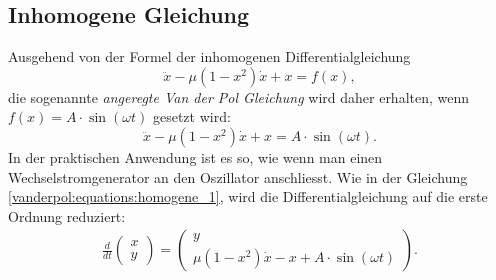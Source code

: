 \subsection{Inhomogene Gleichung}
\label{vanderpol:subsection:inhomogene}
Ausgehend von der Formel der inhomogenen Differentialgleichung
\begin{equation*}
	\ddot{x}-\mu(1-x^{2}) \dot{x}+x = f(x),
\label{vanderpol:equations:inhomogene_gen}
\end{equation*}
die sogenannte {\em angeregte Van der Pol Gleichung} wird daher erhalten, wenn $f(x) = A \cdot \sin(\omega t)$ gesetzt wird:
\begin{equation}
	\ddot{x}-\mu(1-x^{2}) \dot{x}+x = A \cdot \sin(\omega t).
\label{vanderpol:equations:inhomogene_sin}
\end{equation}
In der praktischen Anwendung ist es so, wie wenn man einen Wechselstromgenerator an den Oszillator anschliesst. Wie in der Gleichung \eqref{vanderpol:equations:homogene_1}, wird die Differentialgleichung auf die erste Ordnung reduziert:
\begin{align}
\frac{d}{dt}\begin{pmatrix}x \\ y\end{pmatrix} = \begin{pmatrix}y \\ \mu (1-x^{2})\dot{x}-x+A \cdot \sin(\omega t)\end{pmatrix}.
\label{vanderpol:equations:inhomogene_2}
\end{align}